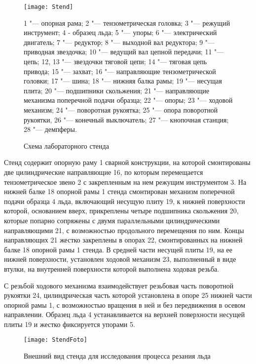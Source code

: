 \begin{figure} [htbp]
	\center
	\texttt{[image: Stend]}
	
	1 "--- опорная рама; 2 "--- тензометрическая головка; 3 "--- режущий инструмент; 4 - образец льда; 5 "--- упоры; 6 "--- электрический двигатель; 7 "--- редуктор; 8 "--- выходной вал редуктора; 9 "--- приводная звездочка; 10 "--- ведущий вал цепной передачи; 11 "--- цепь; 12, 13 "--- звездочки тяговой цепи; 14 "--- тяговая цепь привода; 15 "--- захват; 16 "--- направляющие тензометрической головки; 17 "--- шина; 18 "--- нижняя балка рамы; 19 "--- несущая плита; 20 "--- подшипники скольжения; 21 "--- направляющие механизма поперечной подачи образца; 22 "--- опоры; 23 "--- ходовой механизм; 24 "--- поворотная рукоятка; 25 "--- опора поворотной рукоятки, 26 "--- конечный выключатель; 27 "--- кнопочная станция; 28 "--- демпферы.
	\caption{Схема лабораторного стенда} 
	\label{img:Stend}  
\end{figure}

Стенд содержит опорную раму 1 сварной конструкции, на которой смонтированы две цилиндрические направляющие 16, по которым перемещается тензометрическое звено 2 с закрепленным на нем режущим инструментом 3. На нижней балке 18 опорной рамы 1 стенда смонтирован механизм поперечной подачи образца 4 льда, включающий несущую плиту 19, к нижней поверхности которой, основанием вверх, прикреплены четыре подшипника скольжения 20, которые попарно сопряжены с двумя параллельными цилиндрическими направляющими 21, с возможностью продольного перемещения по ним. Концы направляющих 21 жестко закреплены в опорах 22, смонтированных на нижней балке 18 опорной рамы 1 стенда. В средней части несущей плиты 19, на ее нижней поверхности, установлен ходовой механизм 23, выполненный в виде втулки, на внутренней поверхности которой выполнена ходовая резьба.
 
С резьбой ходового механизма взаимодействует резьбовая часть поворотной рукоятки 24, цилиндрическая часть которой установлена в опоре 25 нижней части опорной рамы 1, с возможностью вращения в ней и без передвижения в осевом направлении. Образец льда 4 устанавливается на верхней поверхности несущей плиты 19 и жестко фиксируется упорами 5.

\begin{figure} [h]
	\center
	\texttt{[image: StendFoto]}
	\caption{Внешний вид стенда для исследования процесса резания льда} 
	\label{img:StendFoto}  
\end{figure}

